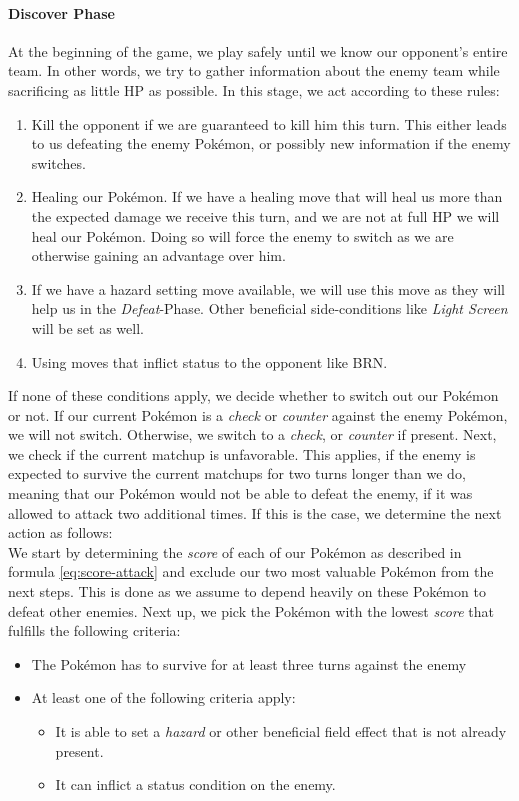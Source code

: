\paragraph{Discover Phase}
At the beginning of the game, we play safely until we know our opponent's entire team. In other words, we try to gather 
information about the enemy team while sacrificing as little \ac{HP} as possible. In this stage, we act according to
these rules:
\begin{enumerate}
	\item Kill the opponent if we are guaranteed to kill him this turn. This either leads to us defeating the 
	enemy Pokémon, or possibly new information if the enemy switches.
	\item Healing our Pokémon. If we have a healing move that will heal us more than the expected damage we receive
	this turn, and we are not at full \ac{HP} we will heal our Pokémon. Doing so will force the enemy to switch as
	we are otherwise gaining an advantage over him. 
	\item If we have a hazard setting move available, we will use this move as they will help us in the \textit{Defeat}-Phase.
	Other beneficial side-conditions like \textit{Light Screen} will be set as well. 
	\item Using moves that inflict status to the opponent like \ac{BRN}.
\end{enumerate}
If none of these conditions apply, we decide whether to switch out our Pokémon or not. If our current Pokémon is a 
\textit{check} or \textit{counter} against the enemy Pokémon, we will not switch. Otherwise, we switch to a \textit{check},
or \textit{counter} if present. Next, we check if the current matchup is unfavorable. This applies, if the enemy
is expected to survive the current matchups for two turns longer than we do, meaning that our Pokémon would not be able
to defeat the enemy, if it was allowed to attack two additional times. If this is the case, we determine the next action
as follows: \\
We start by determining the \textit{score} of each of our Pokémon as described in formula \ref{eq:score-attack} and exclude our
two most valuable Pokémon from the next steps. This is done as we assume to depend heavily on these Pokémon to defeat
other enemies. Next up, we pick the Pokémon with the lowest \textit{score} that fulfills the following 
criteria:
\begin{itemize}
	\item The Pokémon has to survive for at least three turns against the enemy
	\item At least one of the following criteria apply:
	\begin{itemize}
		\item It is able to set a \textit{hazard} or other beneficial field effect that is not already present.
		\item It can inflict a status condition on the enemy.
	\end{itemize}
\end{itemize}
